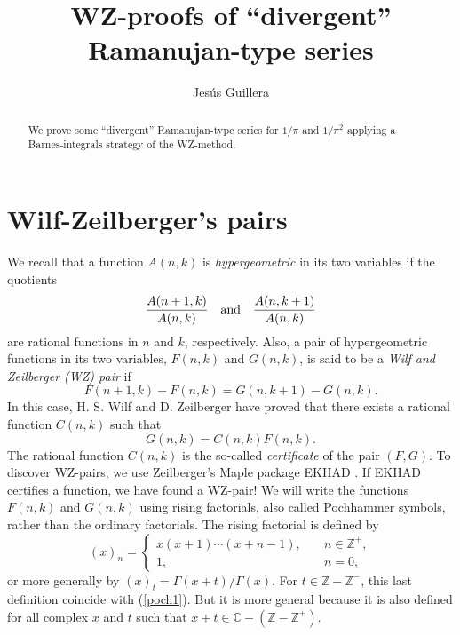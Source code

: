 \documentclass[12pt,a4paper]{amsart}
\begin{document}
\title{WZ-proofs of ``divergent'' Ramanujan-type series}
\author{Jesús Guillera}
\address{Av. Cesáreo Alierta, 31 esc. izda {\rm $4^o$}--A, Zaragoza (Spain)}
\date{}

\newtheorem{observacion}{Remark}

\begin{abstract}
We prove some ``divergent'' Ramanujan-type series for $1/\pi$ and $1/\pi^2$ applying a Barnes-integrals strategy of the WZ-method.
\end{abstract}


\maketitle

\section{Wilf-Zeilberger's pairs}
We recall that a function $A(n,k)$ is \emph{hypergeometric} in its two variables if the quotients
\[
\frac{A(n+1,k)}{A(n,k)} \quad {\rm and} \quad \frac{A(n,k+1)}{A(n,k)}
\]
are rational functions in $n$ and $k$, respectively. Also, a pair of hypergeometric functions in its two variables, $F(n,k)$ and $G(n,k)$, is said to be a \emph{Wilf and Zeilberger (WZ) pair} \cite[Chapt. 7]{petkovsek} if
\begin{equation}\label{pro-WZ-pair}
F(n+1,k)-F(n,k)=G(n,k+1)-G(n,k).
\end{equation}
In this case, H. S. Wilf and D. Zeilberger \cite{wilf} have proved that there exists a rational function $C(n,k)$ such that
\begin{equation}\label{certificado}
G(n,k)=C(n,k)F(n,k).
\end{equation}
The rational function $C(n,k)$ is the so-called \emph{certificate} of the pair $(F,G)$. To discover WZ-pairs, we use Zeilberger's Maple package EKHAD \cite[Appendix A]{petkovsek}. If EKHAD certifies a function, we have found a WZ-pair! We will write the functions $F(n,k)$ and $G(n,k)$ using rising factorials, also called Pochhammer symbols, rather than the ordinary factorials. The rising factorial is defined by
\begin{equation}\label{poch1}
(x)_n=\left\{
\begin{array}{ll}
x(x+1)\cdots(x+n-1), & \quad n \in \mathbb{Z}^{+}, \\
1, & \quad n=0,
\end{array} \right.
\end{equation}
or more generally by $(x)_t=\Gamma(x+t)/\Gamma(x).$ For $t \in \mathbb{Z}-\mathbb{Z}^{-}$, this last definition coincide with (\ref{poch1}). But it is more general because it is also defined for all complex $x$ and $t$ such that
$x+t \in \mathbb{C}- ( \mathbb{Z}-\mathbb{Z}^{+} )$.
\end{document}
